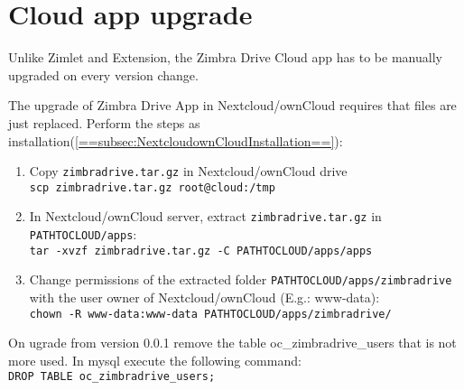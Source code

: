 \section{Cloud app upgrade}
Unlike Zimlet and Extension, the Zimbra Drive Cloud app has to be manually upgraded on every version change.

The upgrade of Zimbra Drive App in Nextcloud/ownCloud requires that files are just replaced.
Perform the steps as installation(\ref{==subsec:NextcloudownCloudInstallation==}):
    \begin{enumerate}
        \item Copy \texttt{zimbradrive.tar.gz} in Nextcloud/ownCloud drive\\ 
        \texttt{scp zimbradrive.tar.gz root@cloud:/tmp}

        \item In Nextcloud/ownCloud server, extract \texttt{zimbradrive.tar.gz}  in \texttt{PATH\textunderscore TO\textunderscore CLOUD/apps}:\\
        \texttt{tar -xvzf zimbradrive.tar.gz -C \texttt{PATH\textunderscore TO\textunderscore CLOUD/apps}/apps}

        \item Change permissions of the extracted folder \texttt{PATH\textunderscore TO\textunderscore CLOUD/apps/zimbradrive}
        with the user owner of Nextcloud/ownCloud (E.g.: www-data):\\
        \texttt{chown -R www-data:www-data PATH\textunderscore TO\textunderscore CLOUD/apps/zimbradrive/}
    \end{enumerate}

\begin{comment}
WARNING:
\end{comment}
\begin{warning}
    On ugrade from version 0.0.1 remove the table oc\_zimbradrive\_users that is not more used. In mysql execute the following command:\\
    \texttt{DROP TABLE oc\_zimbradrive\_users;}
\end{warning}
